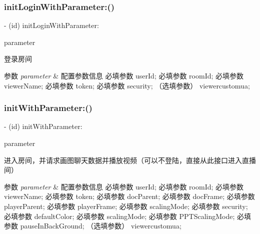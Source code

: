 \subsubsection{\texorpdfstring{init\+Login\+With\+Parameter\+:()}{initLoginWithParameter:()}}
{\footnotesize\ttfamily -\/ (id) init\+Login\+With\+Parameter\+: \begin{DoxyParamCaption}\item[{(\hyperlink{interface_play_parameter}{Play\+Parameter} $\ast$)}]{parameter }\end{DoxyParamCaption}}



登录房间 


\begin{DoxyParams}{参数}
{\em parameter} & 配置参数信息 必填参数 user\+Id; 必填参数 room\+Id; 必填参数 viewer\+Name; 必填参数 token; 必填参数 security; （选填参数） viewercustomua; \\
\hline
\end{DoxyParams}
\mbox{\label{interface_request_data_a67af7937b840135d7240c35aa5a5f78a}} 
\subsubsection{\texorpdfstring{init\+With\+Parameter\+:()}{initWithParameter:()}}
{\footnotesize\ttfamily -\/ (id) init\+With\+Parameter\+: \begin{DoxyParamCaption}\item[{(\hyperlink{interface_play_parameter}{Play\+Parameter} $\ast$)}]{parameter }\end{DoxyParamCaption}}



进入房间，并请求画图聊天数据并播放视频（可以不登陆，直接从此接口进入直播间） 


\begin{DoxyParams}{参数}
{\em parameter} & 配置参数信息 必填参数 user\+Id; 必填参数 room\+Id; 必填参数 viewer\+Name; 必填参数 token; 必填参数 doc\+Parent; 必填参数 doc\+Frame; 必填参数 player\+Parent; 必填参数 player\+Frame; 必填参数 scaling\+Mode; 必填参数 security; 必填参数 default\+Color; 必填参数 scaling\+Mode; 必填参数 P\+P\+T\+Scaling\+Mode; 必填参数 pause\+In\+Back\+Ground; （选填参数） viewercustomua; \\
\hline
\end{DoxyParams}
\mbox{\label{interface_request_data_a2e886316ef2970f8d97020221fe80c56}} 
